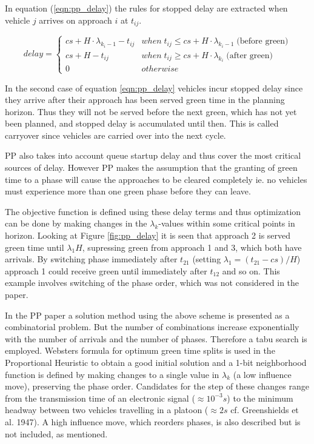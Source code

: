 In equation (\ref{eqn:pp_delay}) the rules for stopped delay are
extracted when vehicle $j$ arrives on approach $i$ at $t_{ij}$.

\begin{equation}
delay = 
\begin{cases}
cs + H \cdot \lambda_{k_i-1} - t_{ij} & when \; t_{ij} \leq cs + H \cdot \lambda_{k_i-1} \; \mbox{(before green)}  \\
cs + H - t_{ij} & when \; t_{ij} \geq cs + H \cdot \lambda_{k_i} \; \mbox{(after green)}  \\
0 & otherwise
\end{cases}
\label{eqn:pp_delay}
\end{equation}

In the second case of equation \ref{eqn:pp_delay} vehicles incur
stopped delay since they arrive after their approach has been served
green time in the planning horizon. Thus they will not be served
before the next green, which has not yet been planned, and stopped
delay is accumulated until then. This is called carryover since
vehicles are carried over into the next cycle.

PP also takes into account queue startup delay and thus cover the most
critical sources of delay. However PP makes the assumption that the
granting of green time to a phase will cause the approaches to be
cleared completely ie. no vehicles must experience more than one green
phase before they can leave.

The objective function is defined using these delay terms and thus
optimization can be done by making changes in the $\lambda_k$-values
within some critical points in horizon. Looking at Figure
\ref{fig:pp_delay} it is seen that approach 2 is served green time
until $\lambda_1 H$, supressing green from approach 1 and 3, which
both have arrivals. By switching phase immediately after $t_{21}$
(setting $\lambda_1 = (t_{21} - cs)/H$) approach 1 could receive green
until immediately after $t_{12}$ and so on. This example involves
switching of the phase order, which was not considered in the paper.

In the PP paper \cite{1} a solution method using the above scheme is
presented as a combinatorial problem. But the number of combinations
increase exponentially with the number of arrivals and the number of
phases. Therefore a tabu search is employed. Websters formula for
optimum green time splits is used in the Proportional Heuristic to
obtain a good initial solution and a 1-bit neighborhood function is
defined by making changes to a single value in $\lambda_k$ (a low
influence move), preserving the phase order. Candidates for the step
of these changes range from the transmission time of an electronic
signal ($\approx 10^{-3}s$) to the minimum headway between two
vehicles travelling in a platoon ($\approx 2s$ cf. Greenshields et
al. 1947).  A high influence move, which reorders phases, is also
described but is not included, as mentioned.

